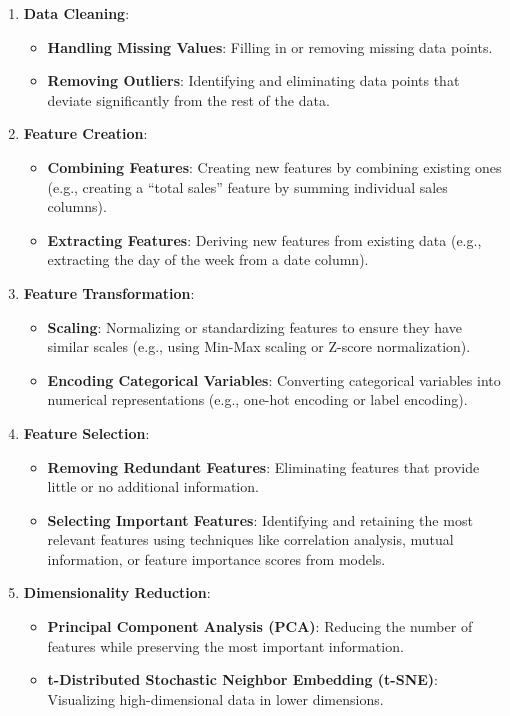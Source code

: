 \documentclass[
  letterpaper,
  DIV=11,
  numbers=noendperiod]{scrreprt}
\providecommand{\tightlist}{%
  \setlength{\itemsep}{0pt}\setlength{\parskip}{0pt}}
\begin{document}
\begin{enumerate}
\def\labelenumi{\alph{enumi})}
\tightlist
\item
  \textbf{Data Cleaning}:

  \begin{itemize}
  \tightlist
  \item
    \textbf{Handling Missing Values}: Filling in or removing missing
    data points.
  \item
    \textbf{Removing Outliers}: Identifying and eliminating data points
    that deviate significantly from the rest of the data.
  \end{itemize}
\item
  \textbf{Feature Creation}:

  \begin{itemize}
  \tightlist
  \item
    \textbf{Combining Features}: Creating new features by combining
    existing ones (e.g., creating a ``total sales'' feature by summing
    individual sales columns).
  \item
    \textbf{Extracting Features}: Deriving new features from existing
    data (e.g., extracting the day of the week from a date column).
  \end{itemize}
\item
  \textbf{Feature Transformation}:

  \begin{itemize}
  \tightlist
  \item
    \textbf{Scaling}: Normalizing or standardizing features to ensure
    they have similar scales (e.g., using Min-Max scaling or Z-score
    normalization).
  \item
    \textbf{Encoding Categorical Variables}: Converting categorical
    variables into numerical representations (e.g., one-hot encoding or
    label encoding).
  \end{itemize}
\item
  \textbf{Feature Selection}:

  \begin{itemize}
  \tightlist
  \item
    \textbf{Removing Redundant Features}: Eliminating features that
    provide little or no additional information.
  \item
    \textbf{Selecting Important Features}: Identifying and retaining the
    most relevant features using techniques like correlation analysis,
    mutual information, or feature importance scores from models.
  \end{itemize}
\item
  \textbf{Dimensionality Reduction}:

  \begin{itemize}
  \tightlist
  \item
    \textbf{Principal Component Analysis (PCA)}: Reducing the number of
    features while preserving the most important information.
  \item
    \textbf{t-Distributed Stochastic Neighbor Embedding (t-SNE)}:
    Visualizing high-dimensional data in lower dimensions.
  \end{itemize}
\end{enumerate}
\end{document}
